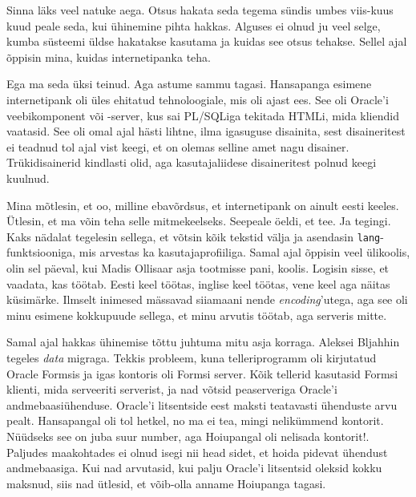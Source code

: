 Sinna läks veel natuke aega. Otsus hakata seda tegema sündis 
umbes viis-kuus kuud peale seda, kui ühinemine pihta hakkas. Alguses  
ei olnud ju veel selge, kumba süsteemi üldse hakatakse kasutama ja kuidas see 
otsus tehakse. Sellel ajal õppisin mina, kuidas internetipanka teha.


Ega ma seda üksi teinud. Aga astume sammu tagasi. Hansapanga esimene 
internetipank oli üles ehitatud tehnoloogiale, mis oli ajast ees. See 
oli Oracle'i veebikomponent või -server, kus 
sai PL/SQLiga tekitada HTMLi, mida kliendid 
vaatasid. See oli omal ajal hästi lihtne, ilma igasuguse disainita, sest 
disaineritest ei teadnud tol ajal vist keegi, et on olemas selline amet nagu disainer. 
Trükidisainerid kindlasti olid, aga kasutajaliidese disaineritest polnud keegi kuulnud. 

Mina mõtlesin, et oo, milline 
ebavõrdsus, et internetipank on ainult eesti keeles. Ütlesin, et ma võin teha selle 
mitmekeelseks. Seepeale öeldi, et tee. Ja tegingi. Kaks nädalat tegelesin 
sellega, et võtsin kõik tekstid välja ja asendasin \verb|lang|-funktsiooniga, mis 
arvestas ka kasutajaprofiiliga. Samal ajal õppisin veel ülikoolis, olin sel
päeval, kui Madis Ollisaar asja tootmisse pani, koolis. 
Logisin sisse, et vaadata, kas töötab. Eesti keel töötas, inglise keel 
töötas, vene keel aga näitas küsimärke. Ilmselt inimesed mässavad siiamaani nende 
\emph{encoding}'utega, aga see oli minu esimene kokkupuude sellega, et minu 
arvutis töötab, aga serveris mitte.

Samal ajal hakkas ühinemise tõttu juhtuma mitu asja korraga.  
Aleksei Bljahhin tegeles \emph{data} migraga. 
Tekkis probleem, kuna telleriprogramm oli kirjutatud Oracle Formsis ja igas 
kontoris oli Formsi server. Kõik tellerid kasutasid Formsi klienti, mida 
serveeriti serverist, ja nad võtsid peaserveriga Oracle'i 
andmebaasiühenduse. Oracle'i litsentside eest maksti teatavasti ühenduste arvu 
pealt. Hansapangal oli tol hetkel, no ma ei tea, mingi nelikümmend 
kontorit. Nüüdseks see on juba suur number, aga Hoiupangal oli nelisada 
kontorit!. Paljudes maakohtades ei olnud isegi nii head sidet, et 
hoida pidevat ühendust andmebaasiga. Kui nad arvutasid, kui palju 
Oracle'i litsentsid oleksid kokku maksnud, siis nad ütlesid, et võib-olla anname 
Hoiupanga tagasi. 

